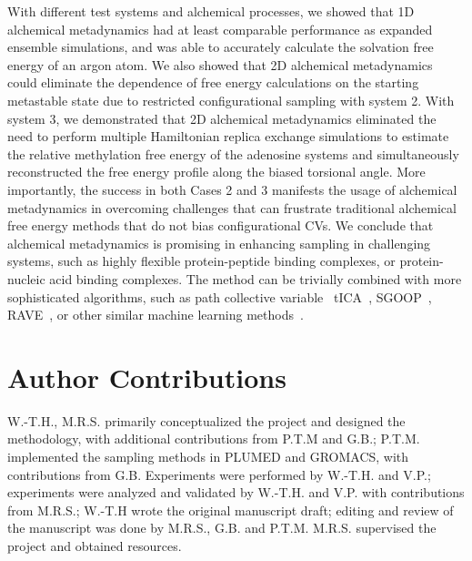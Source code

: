 \documentclass[journal=jacsat,manuscript=article]{achemso}
\begin{document}
With different test systems and alchemical processes, we showed that 1D alchemical metadynamics had at least comparable performance as expanded ensemble simulations, and was able to accurately calculate the solvation free energy of an argon atom. We also showed that 2D alchemical metadynamics could eliminate the dependence of free energy calculations on the starting metastable state due to restricted configurational sampling with system 2. With system 3, we demonstrated that 2D alchemical metadynamics eliminated the need to perform multiple Hamiltonian replica exchange simulations to estimate the relative methylation free energy of the adenosine systems and simultaneously reconstructed the free energy profile along the biased torsional angle. More importantly, the success in both Cases 2 and 3 manifests the usage of alchemical metadynamics in overcoming challenges that can frustrate traditional alchemical free energy methods that do not bias configurational CVs. We conclude that alchemical metadynamics is promising in enhancing sampling in challenging systems, such as highly flexible protein-peptide binding complexes, or protein-nucleic acid binding complexes. The method can be trivially combined with more sophisticated algorithms, such as path collective variable~\cite{branduardi2007b} tICA~\cite{m2017tica}, SGOOP~\cite{tiwary2016spectral}, RAVE~\cite{ribeiro2018reweighted}, or other similar machine learning methods~\cite{rohrdanz2011determination, sultan2018automated, mccarty2017variational, chen2018molecular, wang2019past, wehmeyer2018time}.

\section*{Author Contributions}
W.-T.H., M.R.S. primarily conceptualized the project and designed the methodology, with additional contributions from P.T.M and G.B.; P.T.M. implemented the sampling methods in PLUMED and GROMACS, with contributions from G.B. Experiments were performed by W.-T.H. and V.P.; experiments were analyzed and validated by W.-T.H. and V.P. with contributions from M.R.S.; W.-T.H wrote the original manuscript draft; editing and review of the manuscript was done by M.R.S., G.B. and P.T.M. M.R.S. supervised the project and obtained resources.
\end{document}
